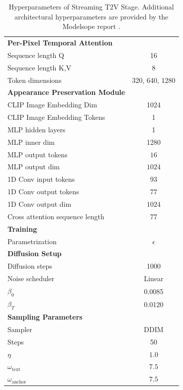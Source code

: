 \begin{table}[t]
    \centering
    
    \begin{tabular}{l|c}
        \textbf{Per-Pixel Temporal Attention} & \\ 
        Sequence length Q & 16 \\
        Sequence length K,V & 8 \\
        Token dimensions & 320, 640, 1280 \\ 
        
        \textbf{Appearance Preservation Module} & \\
        CLIP Image Embedding Dim & 1024 \\
        CLIP Image Embedding Tokens & 1 \\ 
        MLP hidden layers & 1 \\  
        MLP inner dim & 1280 \\
        MLP output tokens & $16$\\
        MLP output dim & $1024$\\
        1D Conv input tokens & 93 \\ 
        1D Conv output tokens & $77$ \\
        1D Conv output dim & $1024$ \\
        Cross attention sequence length & 77 \\
        
        \textbf{Training} & \\
        Parametrization & $\epsilon$ \\
        
        \textbf{Diffusion Setup} & \\
        Diffusion steps & 1000 \\
        Noise scheduler & Linear \\
        $\beta_{0}$ & 0.0085 \\
        $\beta_{T}$ & 0.0120 \\
        
        \textbf{Sampling Parameters} \\
        Sampler & DDIM \\
        Steps & 50 \\
        $\eta$ & $1.0$ \\
        $\omega_{\mathrm{text}}$ & $7.5$ \\ 
        $\omega_{\mathrm{anchor}}$ & $7.5$ \\ 
    \end{tabular}

    \caption{
        Hyperparameters of Streaming T2V Stage. Additional architectural hyperparameters are provided by the Modelsope report  \cite{Modelscope}.
    }
    

    \label{tab:hyperparameters}
\end{table}



